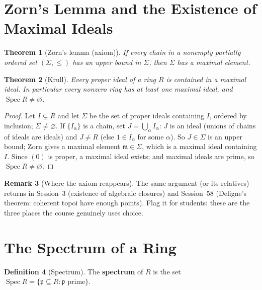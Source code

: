 \documentclass[11pt,a4paper]{article}
\newtheorem{theorem}{Theorem}[section]
\theoremstyle{definition}
\newtheorem{definition}[theorem]{Definition}
\newtheorem{remark}[theorem]{Remark}
\newcommand{\Spec}{\operatorname{Spec}}
\newcommand{\p}{\mathfrak{p}}
\newcommand{\m}{\mathfrak{m}}
\begin{document}
	\section{Zorn's Lemma and the Existence of Maximal Ideals}\label{sec:zorn}
	
	\begin{theorem}[Zorn's lemma (axiom)]
		If every chain in a nonempty partially ordered set $(\Sigma,\le)$ has an upper bound in $\Sigma$,
		then $\Sigma$ has a maximal element.
	\end{theorem}
	
	\begin{theorem}[Krull]\label{thm:krull}
		Every proper ideal of a ring $R$ is contained in a maximal ideal. In particular every nonzero ring
		has at least one maximal ideal, and $\Spec R\neq\varnothing$.
	\end{theorem}
	\begin{proof}
		Let $I\subsetneq R$ and let $\Sigma$ be the set of proper ideals containing $I$, ordered by inclusion;
		$\Sigma\neq\varnothing$. If $\{I_\alpha\}$ is a chain, set $J=\bigcup_\alpha I_\alpha$: $J$ is an ideal
		(unions of chains of ideals are ideals) and $J\neq R$ (else $1\in I_\alpha$ for some $\alpha$). So $J\in\Sigma$
		is an upper bound; Zorn gives a maximal element $\m\in\Sigma$, which is a maximal ideal containing $I$.
		Since $(0)$ is proper, a maximal ideal exists; and maximal ideals are prime, so $\Spec R\neq\varnothing$.
	\end{proof}
	
	\begin{remark}[Where the axiom reappears]
		The same argument (or its relatives) returns in Session~3 (existence of algebraic closures) and
		Session~58 (Deligne's theorem: coherent topoi have enough points). Flag it for students: these are
		the three places the course genuinely uses choice.
	\end{remark}
	
	\section{The Spectrum of a Ring}
	
	\begin{definition}[Spectrum]
		The \textbf{spectrum} of $R$ is the set $\Spec R=\{\p\subseteq R:\p\text{ prime}\}$.
	\end{definition}
	
\end{document}
